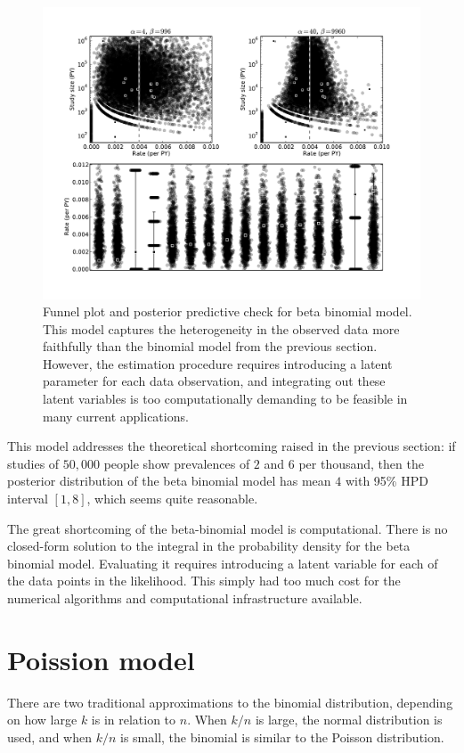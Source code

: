 \begin{figure}[ht]
\begin{center}
\includegraphics[width=\textwidth]{beta-binomial-funnel.pdf}
\end{center}
\caption{Funnel plot and posterior predictive check for beta binomial
  model. This model captures the heterogeneity in the observed data
  more faithfully than the binomial model from the previous section.
  However, the estimation procedure requires introducing a latent
  parameter for each data observation, and integrating out these
  latent variables is too computationally demanding to be feasible in
  many current applications.}
\label{rate-model-beta-binomial-funnel}
\end{figure}

This model addresses the theoretical shortcoming raised in the
previous section: if studies of $50,000$ people show prevalences of
$2$ and $6$ per thousand, then the posterior distribution of the beta
binomial model has mean $4$ with 95\% HPD interval $[1,8]$, which
seems quite reasonable.

The great shortcoming of the beta-binomial model is computational.
There is no closed-form solution to the integral in the probability
density for the beta binomial model.  Evaluating it requires
introducing a latent variable for each of the data points in the
likelihood.  This simply had too much cost for the numerical
algorithms and computational infrastructure available.

\section{Poission model}
There are two traditional approximations to the binomial distribution,
depending on how large $k$ is in relation to $n$.  When $k/n$ is
large, the normal distribution is used, and when $k/n$ is small, the
binomial is similar to the Poisson distribution.


